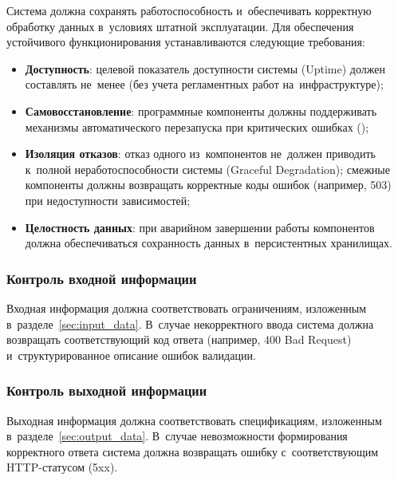 \documentclass[12pt,a4paper]{extarticle}
\begin{document}
\begin{hseExample}
Система должна сохранять работоспособность и~обеспечивать корректную обработку данных в~условиях штатной эксплуатации. Для обеспечения устойчивого функционирования устанавливаются следующие требования:
\begin{itemize}[nosep, leftmargin=1.25cm]
    \item \textbf{Доступность}: целевой показатель доступности системы (Uptime) должен составлять не~менее  (без учета регламентных работ на~инфраструктуре);
    \item \textbf{Самовосстановление}: программные компоненты должны поддерживать механизмы автоматического перезапуска при критических ошибках ();
    \item \textbf{Изоляция отказов}: отказ одного из~компонентов не~должен приводить к~полной неработоспособности системы (Graceful Degradation); смежные компоненты должны возвращать корректные коды ошибок (например, 503) при недоступности зависимостей;
    \item \textbf{Целостность данных}: при аварийном завершении работы компонентов должна обеспечиваться сохранность данных в~персистентных хранилищах.
\end{itemize}
\end{hseExample}

\subsubsection{Контроль входной информации}

\begin{hseExample}
Входная информация должна соответствовать ограничениям, изложенным в~разделе~\ref{sec:input_data}. В~случае некорректного ввода система должна возвращать соответствующий код ответа (например, 400 Bad Request) и~структурированное описание ошибок валидации.
\end{hseExample}

\subsubsection{Контроль выходной информации}

\begin{hseExample}
Выходная информация должна соответствовать спецификациям, изложенным в~разделе~\ref{sec:output_data}. В~случае невозможности формирования корректного ответа система должна возвращать ошибку с~соответствующим HTTP-статусом (5xx).
\end{hseExample}
\end{document}
